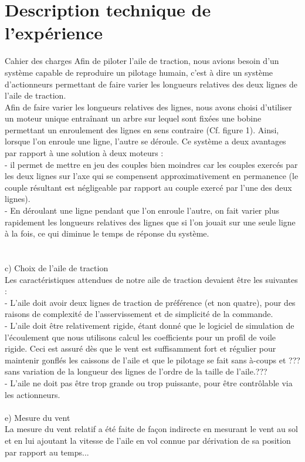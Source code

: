 \documentclass[a4paper,twoside,12pt]{article}
\newcounter{partie}
\newcounter{sous-partie}
\newenvironment{partie}[1]
{
\section{#1}
}
{

}
\newenvironment{sous-partie}[1]
{
\subsection{#1}
}
{

}
\begin{document}
\begin{partie}{Description technique de l'expérience}
\begin{sous-partie}{Cahier des charges}
Afin de piloter l'aile de traction, nous avions besoin d'un système capable de reproduire un pilotage humain, c'est à  dire un système d'actionneurs permettant de faire varier les longueurs relatives des deux lignes de l'aile de traction. %
\\
Afin de faire varier les longueurs relatives des lignes, nous avons choisi d'utiliser un moteur unique entraînant un arbre sur lequel sont fixées une bobine permettant un enroulement des lignes en sens contraire (Cf. %
figure 1). %
Ainsi, lorsque l'on enroule une ligne, l'autre se déroule. %
Ce système a deux avantages par rapport à une solution à deux moteurs :  \\
-	il permet de mettre en jeu des couples bien moindres car les couples exercés par les deux lignes sur l'axe qui se compensent approximativement en permanence (le couple résultant est négligeable par rapport au couple exercé par l'une des deux lignes). %
\\
-	En déroulant une ligne pendant que l'on enroule l'autre, on fait varier plus rapidement les longueurs relatives des lignes que si l'on jouait sur une seule ligne à la fois, ce qui diminue le temps de réponse du système. %
\\
\\
\\
 c) 	Choix de l'aile de traction \\
Les caractéristiques attendues de notre aile de traction devaient être les suivantes : \\
-	L'aile doit avoir deux lignes de traction de préférence (et non quatre), pour des raisons de complexité de l'asservissement et de simplicité de la commande.\\
-	L'aile doit être relativement rigide, étant donné que le logiciel de simulation de l'écoulement que nous utilisons calcul les coefficients pour un profil de voile rigide. %
Ceci est assuré dès que le vent est suffisamment fort et régulier pour maintenir gonflés les caissons de l'aile et que le pilotage se fait sans à-coups et ??? %
sans variation de la longueur des lignes de l'ordre de la taille de l'aile.??? %
 \\
-	L'aile ne doit pas être trop grande ou trop puissante, pour être contrôlable via les actionneurs.\\
\\
e)	Mesure du vent\\
La mesure du vent relatif a été faite de façon indirecte en mesurant le vent au sol et en lui ajoutant la vitesse de l'aile en vol connue par dérivation de sa position par rapport au temps... %


\end{sous-partie}
\end{partie}
\end{document}

